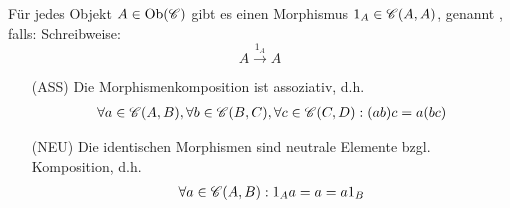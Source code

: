 \begin{lemma}
	Für jedes Objekt $A\in\operatorname{Ob}(\mathscr{C})$ gibt es einen Morphismus $1_A\in\mathscr{C}(A,A)$, genannt , falls:
	Schreibweise:
	$$ A\overset{1_A}{\longrightarrow}A$$
	\begin{enumerate}
		\item[(ASS)] Die Morphismenkomposition ist assoziativ, d.h.
		\begin{align*}
			\forall a\in\mathscr{C}(A,B),\forall b\in\mathscr{C}(B,C),\forall c\in\mathscr{C}(C,D):(ab)c=a(bc)
		\end{align*}		 
		\item[(NEU)] Die identischen Morphismen sind neutrale Elemente bzgl. Komposition, d.h. 
		\begin{align*}
			\forall a\in\mathscr{C}(A,B):1_A a=a=a 1_B
		\end{align*}
	\end{enumerate}
\end{lemma}